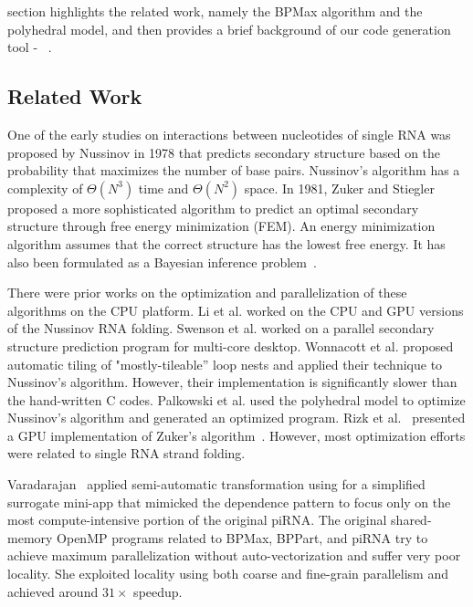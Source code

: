  section highlights the related work, namely the BPMax algorithm and the polyhedral model, and then provides a brief background of our code generation tool - \alphaz\ .

\subsection{Related Work}
One of the early studies on interactions between nucleotides of single RNA was proposed by Nussinov\cite{Nussinov1978} in 1978 that predicts secondary structure based on the probability that maximizes the number of base pairs. Nussinov's algorithm has a complexity of $\Theta(N^3)$ time and $\Theta(N^2)$ space. In 1981, Zuker and Stiegler~\cite{Zuker1981} proposed 
a more sophisticated algorithm to predict an optimal secondary structure through free energy minimization (FEM). An energy minimization algorithm assumes that the correct structure has the lowest free energy.  It has also been formulated as a Bayesian inference problem~\cite{Ding1999}.


There were prior works on the optimization and parallelization of these algorithms on the CPU platform. Li et al.\cite{Li2013} worked on the CPU and GPU versions of the Nussinov\cite{Nussinov1978} RNA folding. Swenson et al. \cite{Swenson2012}  worked on a parallel secondary structure prediction program for multi-core desktop. Wonnacott et al. \cite{Wonnacott2015} proposed automatic tiling of "mostly-tileable” loop nests and applied their technique to Nussinov’s algorithm. However, their implementation is significantly slower than the hand-written C codes. Palkowski et al. \cite{Palkowski2019} used the polyhedral model to optimize Nussinov's\cite{Nussinov1978} algorithm and generated an optimized program. Rizk et al.~\cite{Rizk2011} presented a GPU implementation of Zuker’s algorithm~\cite{Zuker1981}. However, most optimization efforts were related to single RNA strand folding. 


Varadarajan~\cite{Varadarajan2016, Varadarajan2019} applied semi-automatic transformation using  \textbf{\alphaz} for a simplified surrogate mini-app that mimicked the dependence pattern to focus only on the most compute-intensive portion of the original piRNA. The original shared-memory OpenMP programs related to BPMax, BPPart, and piRNA try to achieve maximum parallelization without auto-vectorization and suffer very poor locality. She exploited locality using both coarse and fine-grain parallelism and achieved around $31 \times$ speedup.  

